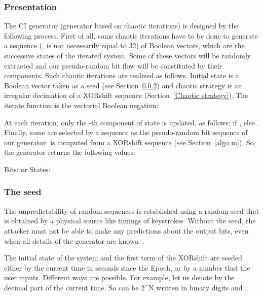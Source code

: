 \documentclass[journal]{IEEEtran}
\begin{document}
\subsubsection{Presentation}
The CI generator (generator based on chaotic iterations) is designed by the following process. First of all, some chaotic iterations have to be done to generate a sequence  (,  is not necessarily equal to 32) of Boolean vectors, which are the successive states of the iterated system. Some of these vectors will be randomly extracted and our pseudo-random bit flow will be constituted by their components. Such chaotic iterations are realized as follows. Initial state  is a Boolean vector taken as a seed (see Section~\ref{algo seed}) and chaotic strategy  is
an irregular decimation of a XORshift sequence (Section~\ref{Chaotic strategy}). The iterate function  is
the vectorial Boolean negation:

At each iteration, only the -th component of state  is updated, as follows:  if , else .
Finally, some  are selected
by a sequence  as the pseudo-random bit sequence of our generator.
 is computed from a XORshift sequence  (see Section~\ref{algo m}). So, the
generator returns the following values:\newline
\begin{small}
Bits:
or States:
\end{small}


\subsubsection{The seed}
\label{algo seed}
The unpredictability of random sequences is established using
a random seed that is obtained by a physical source like timings of keystrokes.
Without the seed, the attacker must not be able to make any predictions about
the output bits, even when all details of the generator are known~\cite{Turan2008}.

The initial state of the system  and the first term  of the XORshift are seeded either by
the current time in seconds since the Epoch, or by a number that the user inputs.
Different ways are possible. For example, let us denote by  the decimal part of the current
time. So  can be 2^N written in binary digits and .
\end{document}
